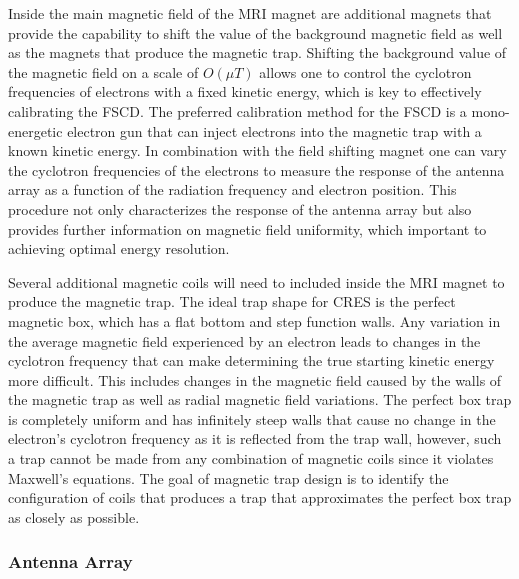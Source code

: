 Inside the main magnetic field of the MRI magnet are additional magnets that provide the capability to shift the value of the background magnetic field as well as the magnets that produce the magnetic trap. Shifting the background value of the magnetic field on a scale of $O(\mu T)$ allows one to control the cyclotron frequencies of electrons with a fixed kinetic energy, which is key to effectively calibrating the FSCD. The preferred calibration method for the FSCD is a mono-energetic electron gun that can inject electrons into the magnetic trap with a known kinetic energy. In combination with the field shifting magnet one can vary the cyclotron frequencies of the electrons to measure the response of the antenna array as a function of the radiation frequency and electron position. This procedure not only characterizes the response of the antenna array but also provides further information on magnetic field uniformity, which important to achieving optimal energy resolution.

Several additional magnetic coils will need to included inside the MRI magnet to produce the magnetic trap. The ideal trap shape for CRES is the perfect magnetic box, which has a flat bottom and step function walls. Any variation in the average magnetic field experienced by an electron leads to changes in the cyclotron frequency that can make determining the true starting kinetic energy more difficult. This includes changes in the magnetic field caused by the walls of the magnetic trap as well as radial magnetic field variations. The perfect box trap is completely uniform and has infinitely steep walls that cause no change in the electron's cyclotron frequency as it is reflected from the trap wall, however, such a trap cannot be made from any combination of magnetic coils since it violates Maxwell's equations. The goal of magnetic trap design is to identify the configuration of coils that produces a trap that approximates the perfect box trap as closely as possible.

\subsubsection*{Antenna Array}

